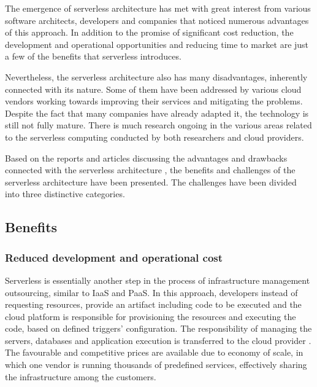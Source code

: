 The emergence of serverless architecture has met with great interest from various software architects, developers and companies that noticed numerous advantages of this approach. In addition to the promise of significant cost reduction, the development and operational opportunities and reducing time to market are just a few of the benefits that serverless introduces.

Nevertheless, the serverless architecture also has many disadvantages, inherently connected with its nature. Some of them have been addressed by various cloud vendors working towards improving their services and mitigating the problems. Despite the fact that many companies have already adapted it, the technology is still not fully mature. There is much research ongoing in the various areas related to the serverless computing conducted by both researchers and cloud providers.

Based on the reports and articles discussing the advantages and drawbacks connected with the serverless architecture \cite{MartinFowlerServerless} \cite{BerkeleyServerless} \cite{ServerlessComputingSurveyOfOpportunitiesChallengesApplications} \cite{LeveragingServerlessCloudComputingArchitectures}, the benefits and challenges of the serverless architecture have been presented. The challenges have been divided into three distinctive categories.

\subsection{Benefits}

\subsubsection*{Reduced development and operational cost}

Serverless is essentially another step in the process of infrastructure management outsourcing, similar to IaaS and PaaS. In this approach, developers instead of requesting resources, provide an artifact including code to be executed and the cloud platform is responsible for provisioning the resources and executing the code, based on defined triggers' configuration. The responsibility of managing the servers, databases and application execution is transferred to the cloud provider \cite{BerkeleyServerless}. The favourable and competitive prices are available due to economy of scale, in which one vendor is running thousands of predefined services, effectively sharing the infrastructure among the customers.

